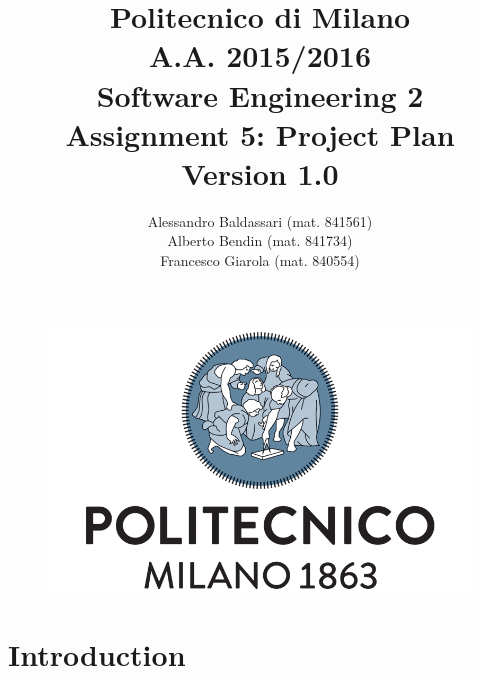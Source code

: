 \documentclass[a4paper,11pt]{report} %
\title{Politecnico di Milano\\A.A. 2015/2016\\Software Engineering 2\\ \bigskip 
Assignment 5: Project Plan\\
{\normalsize Version 1.0}}
\author{Alessandro Baldassari (mat. 841561) \\ Alberto Bendin (mat. 841734) \\ Francesco Giarola (mat. 840554)}
\begin{document}
	
	
	\begin{figure}[t]
		\centering
		\includegraphics[width=1\linewidth]{"Pictures/polimi-logo"}
		\label{fig:polimi-logo}
	\end{figure}
	
	\maketitle
		
	
	\thispagestyle{empty}
	\clearpage\mbox{}\clearpage

	
	
	
	\renewcommand*\thesection{\arabic{section}}
	\renewcommand*\thesubsection{\arabic{section}.\arabic{subsection}}
	\renewcommand*\thesubsubsection{%
	\arabic{section}.\arabic{subsection}.\arabic{subsubsection}%
	}
	\setcounter{secnumdepth}{4}
	\setcounter{tocdepth}{4}
	

	
	\tableofcontents
	\newpage
	
	
	
	\renewcommand{\arraystretch}{1.2}
	\setlength{\tabcolsep}{12pt}
	
	\section{Introduction} 
\end{document}

